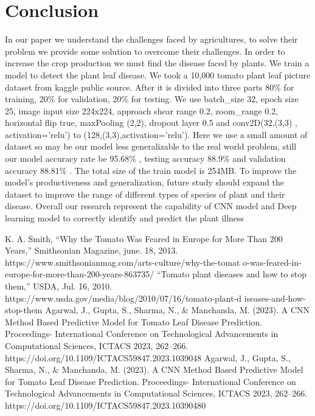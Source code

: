 \documentclass[conference]{IEEEtran}
\begin{document}
\section{Conclusion}
In our paper we understand the challenges faced by agricultures, to solve their problem we provide some solution to overcome their challenges. In order to increase the crop production we must find the disease faced by plants. We train a model to detect the plant leaf disease. We took a 10,000 tomato plant leaf picture dataset from kaggle public source. After it is divided into three parts 80\% for training, 20\% for validation, 20\% for testing. We use batch\_size 32, epoch size 25, image input size 224x224, approach shear range 0.2, zoom\_range 0.2, horizontal flip true, maxPooling (2,2), dropout layer 0.5 and conv2D(32,(3,3) , activation=’relu’) to (128,(3,3),activation=’relu’). Here we use a small amount of dataset so may be our model less generalizable to the real world problem, still our model accuracy rate be 95.68\% , testing accuracy 88.9\% and validation accuracy 88.81\% . The total size of the train model is 254MB. To improve the model's productiveness and generalization, future study should expand the dataset to improve the range of different types of species of plant and their disease. Overall our research represent the capability of CNN model and Deep learning model to correctly identify and predict the plant illness

\begin{thebibliography}{00}
 K. A. Smith, “Why the Tomato Was Feared in Europe for More Than 200 Years,” Smithsonian Magazine, june. 18, 2013. https://www.smithsonianmag.com/arts-culture/why-the-tomat o-was-feared-in-europe-for-more-than-200-years-863735/
 “Tomato plant diseases and how to stop them,” USDA, Jul. 16, 2010. https://www.usda.gov/media/blog/2010/07/16/tomato-plant-d iseases-and-how-stop-them
 Agarwal, J., Gupta, S., Sharma, N., \& Manchanda, M. (2023). A CNN Method Based Predictive Model for Tomato Leaf Disease Prediction. Proceedings- International Conference on Technological Advancements in Computational Sciences, ICTACS 2023, 262–266. https://doi.org/10.1109/ICTACS59847.2023.1039048
 Agarwal, J., Gupta, S., Sharma, N., \& Manchanda, M. (2023). A CNN Method Based Predictive Model for Tomato Leaf Disease Prediction. Proceedings- International Conference on Technological Advancements in Computational Sciences, ICTACS 2023, 262–266. https://doi.org/10.1109/ICTACS59847.2023.10390480
\end{thebibliography}
\end{document}
